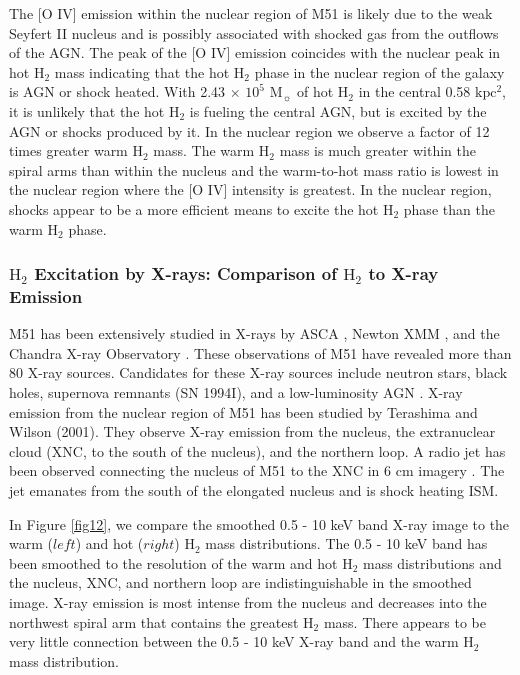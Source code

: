 \documentclass[manuscript]{aastex}
\begin{document}
The [O IV] emission within the nuclear region of M51 is likely due to
the weak Seyfert II nucleus \citep{ford85} and is possibly associated
with shocked gas from the outflows of the AGN.  The peak of the [O IV]
emission coincides with the nuclear peak in hot $\mathrm{H_2}$ mass
indicating that the hot $\mathrm{H_2}$ phase in the nuclear region of
the galaxy is AGN or shock heated.  With 2.43 $\times$ $\mathrm{10^5}$
$\mathrm{M_\sun}$ of hot $\mathrm{H_2}$ in the central 0.58
$\mathrm{kpc^2}$, it is unlikely that the hot $\mathrm{H_2}$ is
fueling the central AGN, but is excited by the AGN or shocks produced
by it.  In the nuclear region we observe a factor of 12 times greater
warm $\mathrm{H_2}$ mass.  The warm $\mathrm{H_2}$ mass is much
greater within the spiral arms than within the nucleus and the
warm-to-hot mass ratio is lowest in the nuclear region where the [O
  IV] intensity is greatest.  In the nuclear region, shocks appear to
be a more efficient means to excite the hot $\mathrm{H_2}$ phase than
the warm $\mathrm{H_2}$ phase.


\subsubsection{$\mathrm{H_2}$ Excitation by X-rays: Comparison of $\mathrm{H_2}$ to X-ray Emission}

M51 has been extensively studied in X-rays by ASCA \citep{ter98},
Newton XMM \citep{dew05}, and the Chandra X-ray Observatory
\citep{wil01}. These observations of M51 have revealed more than 80
X-ray sources.  Candidates for these X-ray sources include neutron
stars, black holes, supernova remnants (SN 1994I), and a
low-luminosity AGN \citep{imm02, wil01}.  X-ray emission from the
nuclear region of M51 has been studied by Terashima and Wilson (2001).
They observe X-ray emission from the nucleus, the extranuclear cloud
(XNC, to the south of the nucleus), and the northern loop.  A radio
jet has been observed connecting the nucleus of M51 to the XNC in 6 cm
imagery \citep{cra92}.  The jet emanates from the south of the
elongated nucleus and is shock heating ISM.

In Figure \ref{fig12}, we compare the smoothed 0.5 - 10 keV band X-ray
image to the warm ($left$) and hot ($right$) $\mathrm{H_2}$ mass
distributions.  The 0.5 - 10 keV band has been smoothed to the
resolution of the warm and hot $\mathrm{H_2}$ mass distributions and
the nucleus, XNC, and northern loop are indistinguishable in the
smoothed image.  X-ray emission is most intense from the nucleus and
decreases into the northwest spiral arm that contains the greatest
$\mathrm{H_2}$ mass.  There appears to be very little connection
between the 0.5 - 10 keV X-ray band and the warm $\mathrm{H_2}$ mass
distribution.
\end{document}
